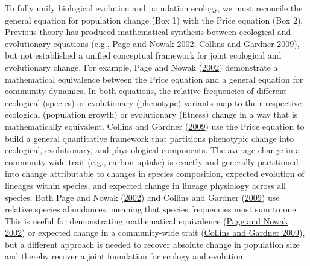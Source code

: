 \documentclass[
]{article}
\begin{document}
To fully unify biological evolution and population ecology, we must
reconcile the general equation for population change (Box 1) with the
Price equation (Box 2). Previous theory has produced mathematical
synthesis between ecological and evolutionary equations (e.g.,
\protect\hyperlink{ref-Page2002}{Page and Nowak 2002};
\protect\hyperlink{ref-Collins2009}{Collins and Gardner 2009}), but not
established a unified conceptual framework for joint ecological and
evolutionary change. For example, Page and Nowak
(\protect\hyperlink{ref-Page2002}{2002}) demonstrate a mathematical
equivalence between the Price equation and a general equation for
community dynamics. In both equations, the relative frequencies of
different ecological (species) or evolutionary (phenotype) variants map
to their respective ecological (population growth) or evolutionary
(fitness) change in a way that is mathematically equivalent. Collins and
Gardner (\protect\hyperlink{ref-Collins2009}{2009}) use the Price
equation to build a general quantitative framework that partitions
phenotypic change into ecological, evolutionary, and physiological
components. The average change in a community-wide trait (e.g., carbon
uptake) is exactly and generally partitioned into change attributable to
changes in species composition, expected evolution of lineages within
species, and expected change in lineage physiology across all species.
Both Page and Nowak (\protect\hyperlink{ref-Page2002}{2002}) and Collins
and Gardner (\protect\hyperlink{ref-Collins2009}{2009}) use relative
species abundances, meaning that species frequencies must sum to one.
This is useful for demonstrating mathematical equivalence
(\protect\hyperlink{ref-Page2002}{Page and Nowak 2002}) or expected
change in a community-wide trait
(\protect\hyperlink{ref-Collins2009}{Collins and Gardner 2009}), but a
different approach is needed to recover absolute change in population
size and thereby recover a joint foundation for ecology and evolution.
\end{document}
